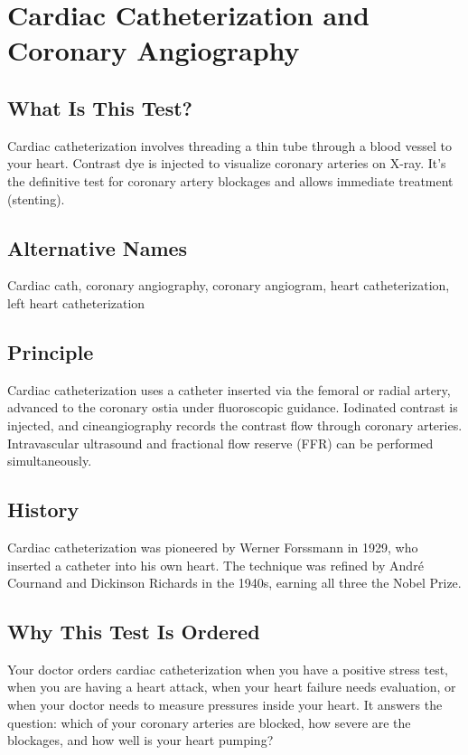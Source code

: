 \chapter{Cardiac Catheterization and Coronary Angiography}

\section*{What Is This Test?}
Cardiac catheterization involves threading a thin tube through a blood vessel to your heart. Contrast dye is injected to visualize coronary arteries on X-ray. It's the definitive test for coronary artery blockages and allows immediate treatment (stenting).

\section*{Alternative Names}
Cardiac cath, coronary angiography, coronary angiogram, heart catheterization, left heart catheterization


\section*{Principle}
Cardiac catheterization uses a catheter inserted via the femoral or radial artery, advanced to the coronary ostia under fluoroscopic guidance. Iodinated contrast is injected, and cineangiography records the contrast flow through coronary arteries. Intravascular ultrasound and fractional flow reserve (FFR) can be performed simultaneously.

\section*{History}
Cardiac catheterization was pioneered by Werner Forssmann in 1929, who inserted a catheter into his own heart. The technique was refined by André Cournand and Dickinson Richards in the 1940s, earning all three the Nobel Prize.

\section*{Why This Test Is Ordered}
Your doctor orders cardiac catheterization when you have a positive stress test, when you are having a heart attack, when your heart failure needs evaluation, or when your doctor needs to measure pressures inside your heart. It answers the question: which of your coronary arteries are blocked, how severe are the blockages, and how well is your heart pumping?

